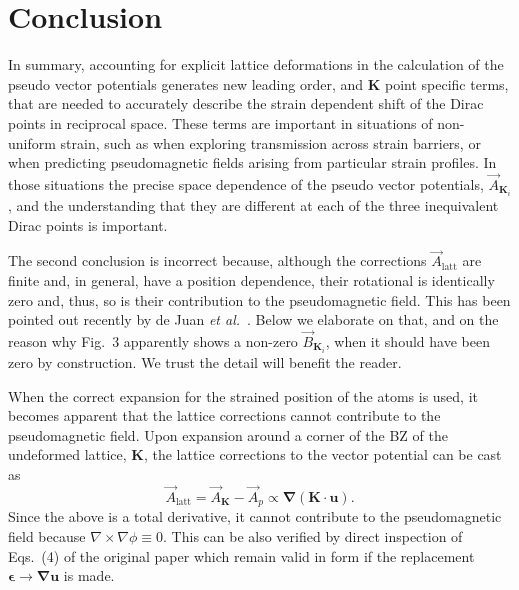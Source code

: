 \section{Conclusion}

In summary, accounting for explicit lattice deformations in the calculation of the pseudo vector potentials generates new leading order, and $\bm{K}$ point specific terms, that are needed to accurately describe the strain dependent shift of the Dirac points in reciprocal space. These terms are important in situations of non-uniform strain, such as when exploring transmission across strain barriers, or when predicting pseudomagnetic fields arising from particular strain profiles.
In those situations the precise space dependence of the pseudo vector potentials, $\vec{A}_{\bm{K}_i}$, and the understanding that they are different at each of the three inequivalent Dirac points is important.

\setlength{\parindent}{0em}
\setlength{\parskip}{1em}



The second conclusion is incorrect because, although the corrections $\vec{A}_\text{latt}$ are finite and, in general, have a position dependence, their rotational is identically zero and, thus, so is their contribution to the pseudomagnetic field. This has been pointed out recently by de Juan \emph{et al.}~\cite{DeJuan2013}. Below we elaborate on that, and on the reason why Fig.~3 apparently shows a non-zero $\vec{B}_{\bm{K}_i}$, when it should have been zero by construction. We trust the detail will benefit the reader.




When the correct expansion for the strained position of the atoms is used, it becomes apparent that the lattice corrections cannot contribute to the pseudomagnetic field. Upon expansion around a corner of the BZ of the undeformed lattice, $\bm{K}$, the lattice corrections to the vector potential can be cast as \cite{DeJuan2013}
%
\begin{equation}
  \vec{A}_\text{latt}=\vec{A}_{\bm{K}}-\vec{A}_p \propto \bm{\nabla} (\bm{K}\cdot\bm{u})
  .
\end{equation}
%
Since the above is a total derivative, it cannot contribute to the pseudomagnetic field because $\nabla\times\nabla \phi \equiv 0$. This can be also verified by direct inspection of Eqs.~(4) of the original paper which remain valid in form if the replacement $\bm{\epsilon } \to \bm{ \nabla u }$ is made.

